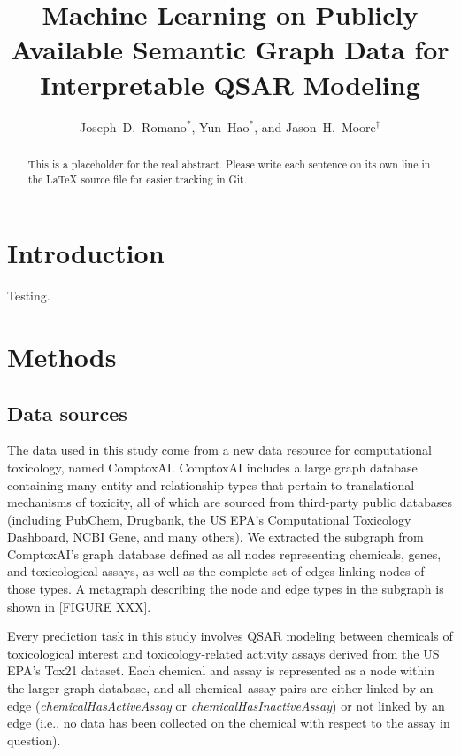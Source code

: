 \documentclass{ws-procs11x85}
\begin{document}
\title{Machine Learning on Publicly Available Semantic Graph Data for Interpretable QSAR Modeling}

\author{Joseph~D.~Romano$^*$, Yun~Hao$^*$, and Jason~H.~Moore$^\dag$}

\address{Institute for Biomedical Informatics, University of Pennsylvania,\\
Philadelphia, Pennsylvania 19104, United States\\
$^\dag$E-mail: jhmoore@upenn.edu\\
$^*$These authors contributed equally.}

\begin{abstract}
This is a placeholder for the real abstract.
Please write each sentence on its own line in the \LaTeX{} source file for easier tracking in Git.
\end{abstract}


\section{Introduction}\label{aba:sec1}
Testing.

\section{Methods}

\subsection{Data sources}
The data used in this study come from a new data resource for computational toxicology, named ComptoxAI.
ComptoxAI includes a large graph database containing many entity and relationship types that pertain to translational mechanisms of toxicity, all of which are sourced from third-party public databases (including PubChem, Drugbank, the US EPA's Computational Toxicology Dashboard, NCBI Gene, and many others).
We extracted the subgraph from ComptoxAI's graph database defined as all nodes representing chemicals, genes, and toxicological assays, as well as the complete set of edges linking nodes of those types.
A metagraph describing the node and edge types in the subgraph is shown in [FIGURE XXX].

Every prediction task in this study involves QSAR modeling between chemicals of toxicological interest and toxicology-related activity assays derived from the US EPA's Tox21 dataset.
Each chemical and assay is represented as a node within the larger graph database, and all chemical--assay pairs are either linked by an edge (\textit{chemicalHasActiveAssay} or \textit{chemicalHasInactiveAssay}) or not linked by an edge (i.e., no data has been collected on the chemical with respect to the assay in question). 
\end{document}
